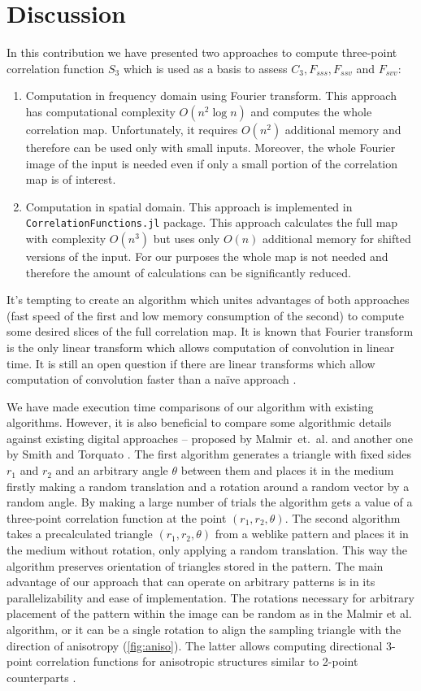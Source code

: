 \documentclass[reprint,amsmath,amssymb,aps,pre,showkeys,showpacs]{revtex4-1}
\newcommand{\code}[1]{\colorbox{light-gray}{\texttt{#1}}}
\begin{document}
\section{Discussion}
\label{sec:discussion}
In this contribution we have presented two approaches to compute three-point correlation
function $S_3$ which is used as a basis to assess $C_3, F_{sss}, F_{ssv}$ and $F_{svv}$:
\begin{enumerate}
\item Computation in frequency domain using Fourier transform. This approach has
  computational complexity $O(n^2 \log n)$ and computes the whole correlation
  map. Unfortunately, it requires $O(n^2)$ additional memory and therefore can
  be used only with small inputs. Moreover, the whole Fourier image of the input
  is needed even if only a small portion of the correlation map is of interest.
\item Computation in spatial domain. This approach is implemented in
  \code{CorrelationFunctions.jl} package. This approach calculates the full map with
  complexity $O(n^3)$ but uses only $O(n)$ additional memory for shifted
  versions of the input. For our purposes the whole map is not needed and
  therefore the amount of calculations can be significantly reduced.
\end{enumerate}
It's tempting to create an algorithm which unites advantages of both approaches
(fast speed of the first and low memory consumption of the second) to
compute some desired slices of the full correlation map. It is known that Fourier
transform is the only linear transform which allows computation of convolution
in linear time. It is still an open question if there are linear transforms which
allow computation of convolution faster than a naïve approach
\cite{stone2008uniqueness,stone1998convolution}.

We have made execution time comparisons of our algorithm with existing
algorithms.  However, it is also beneficial to compare some algorithmic details
against existing digital approaches -- proposed by Malmir~et.~al.
\cite{malmir2018} and another one by Smith and Torquato \cite{SMITH1988176}. The
first algorithm generates a triangle with fixed sides $r_1$ and $r_2$ and an
arbitrary angle $\theta$ between them and places it in the medium firstly making
a random translation and a rotation around a random vector by a random angle. By
making a large number of trials the algorithm gets a value of a three-point
correlation function at the point $(r_1, r_2, \theta)$. The second algorithm
takes a precalculated triangle $(r_1, r_2, \theta)$ from a weblike pattern and
places it in the medium without rotation, only applying a random
translation. This way the algorithm preserves orientation of triangles stored in
the pattern. The main advantage of our approach that can operate on arbitrary patterns is in
its parallelizability and ease of implementation. The rotations necessary
for arbitrary placement of the pattern within the image can be random as in the
Malmir et al. algorithm, or it can be a single rotation to align the sampling
triangle with the direction of anisotropy (\cref{fig:aniso}). The latter allows
computing directional 3-point correlation functions for anisotropic structures
similar to 2-point counterparts \cite{10.1063/1.4867611,EPL1}.
\end{document}
